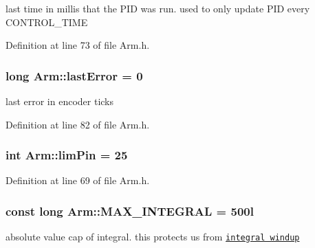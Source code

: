 last time in millis that the P\-I\-D was run. used to only update P\-I\-D every C\-O\-N\-T\-R\-O\-L\-\_\-\-T\-I\-M\-E 



Definition at line 73 of file Arm.\-h.

\hypertarget{classArm_a5061b95381cc72d417f5a5275b871e47}{
\subsubsection[{last\-Error}]{\setlength{\rightskip}{0pt plus 5cm}long Arm\-::last\-Error = 0\hspace{0.3cm}{\ttfamily [private]}}}\label{classArm_a5061b95381cc72d417f5a5275b871e47}


last error in encoder ticks 



Definition at line 82 of file Arm.\-h.

\hypertarget{classArm_aade413d7d638bff08bcc0c9ac50818e1}{
\subsubsection[{lim\-Pin}]{\setlength{\rightskip}{0pt plus 5cm}int Arm\-::lim\-Pin = 25\hspace{0.3cm}{\ttfamily [private]}}}\label{classArm_aade413d7d638bff08bcc0c9ac50818e1}


Definition at line 69 of file Arm.\-h.

\hypertarget{classArm_a05988f2c31e40dd3894c1343bf73a7b8}{
\subsubsection[{M\-A\-X\-\_\-\-I\-N\-T\-E\-G\-R\-A\-L}]{\setlength{\rightskip}{0pt plus 5cm}const long Arm\-::\-M\-A\-X\-\_\-\-I\-N\-T\-E\-G\-R\-A\-L = 500l\hspace{0.3cm}{\ttfamily [private]}}}\label{classArm_a05988f2c31e40dd3894c1343bf73a7b8}


absolute value cap of integral. this protects us from \href{https://en.wikipedia.org/wiki/Integral_windup}{\tt integral windup} 



